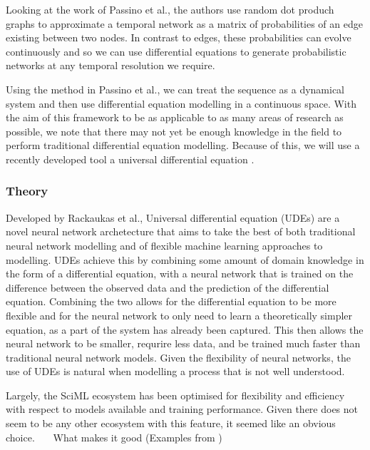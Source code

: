 \documentclass[12pt]{amsart}
\begin{document}
    Looking at the work of Passino et al.\cite{sanna2021link}, the authors use random dot produch graphs\cite{athreya2017statistical} to approximate a temporal network as a matrix of probabilities of an edge existing between two nodes. In contrast to edges, these probabilities can evolve continuously and so we can use differential equations to generate probabilistic networks at any temporal resolution we require.

    Using the method in Passino et al.\cite{sanna2021link}, we can treat the sequence as a dynamical system and then use differential equation modelling in a continuous space. With the aim of this framework to be as applicable to as many areas of research as possible, we note that there may not yet be enough knowledge in the field to perform traditional differential equation modelling. Because of this, we will use a recently developed tool a universal differential equation \cite{SciML_C_Rak}.

    \subsubsection{Theory}
        Developed by Rackaukas et al.\cite{SciML_C_Rak}, Universal differential equation (UDEs) are a novel neural network archetecture that aims to take the best of both traditional neural network modelling and of flexible machine learning approaches to modelling. UDEs achieve this by combining some amount of domain knowledge in the form of a differential equation, with a neural network that is trained on the difference between the observed data and the prediction of the differential equation. Combining the two allows for the differential equation to be more flexible and for the neural network to only need to learn a theoretically simpler equation, as a part of the system has already been captured. This then allows the neural network to be smaller, requrire less data, and be trained much faster than traditional neural network models. Given the flexibility of neural networks, the use of UDEs is natural when modelling a process that is not well understood\cite{kidger2022neural}. 
        
        
        Largely, the SciML ecosystem has been optimised for flexibility and efficiency with respect to models available 
        and training performance. Given there does not seem to be any other ecosystem with this feature, it seemed like 
        an obvious choice. ~~~What makes it good (Examples from \cite{SciML_C_Rak})  
    
\end{document}
